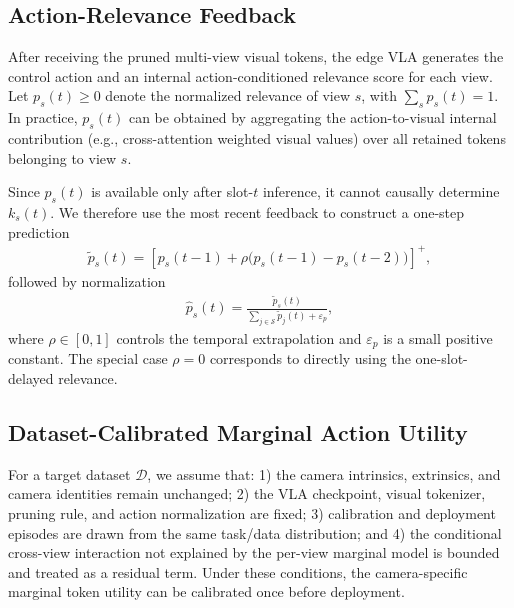 \documentclass[lettersize,journal]{IEEEtran}
\theoremstyle{custom}
\begin{document}
\subsection{Action-Relevance Feedback}
After receiving the pruned multi-view visual tokens, the edge VLA generates the control action and an internal action-conditioned relevance score for each view. Let $p_s(t)\geq0$ denote the normalized relevance of view $s$, with $\sum_s p_s(t)=1$. In practice, $p_s(t)$ can be obtained by aggregating the action-to-visual internal contribution (e.g., cross-attention weighted visual values) over all retained tokens belonging to view $s$.

Since $p_s(t)$ is available only after slot-$t$ inference, it cannot causally determine $k_s(t)$. We therefore use the most recent feedback to construct a one-step prediction
\begin{align}\label{eq:relevance_predictor}
    \widetilde p_s(t)
    =\left[p_s(t-1)+\rho\big(p_s(t-1)-p_s(t-2)\big)\right]^+,
\end{align}
followed by normalization
\begin{align}
    \widehat p_s(t)=\frac{\widetilde p_s(t)}{\sum_{j\in\mathcal S}\widetilde p_j(t)+\varepsilon_p},
\end{align}
where $\rho\in[0,1]$ controls the temporal extrapolation and $\varepsilon_p$ is a small positive constant. The special case $\rho=0$ corresponds to directly using the one-slot-delayed relevance.

\subsection{Dataset-Calibrated Marginal Action Utility}
For a target dataset $\mathcal D$, we assume that: 1) the camera intrinsics, extrinsics, and camera identities remain unchanged; 2) the VLA checkpoint, visual tokenizer, pruning rule, and action normalization are fixed; 3) calibration and deployment episodes are drawn from the same task/data distribution; and 4) the conditional cross-view interaction not explained by the per-view marginal model is bounded and treated as a residual term. Under these conditions, the camera-specific marginal token utility can be calibrated once before deployment.
\end{document}
